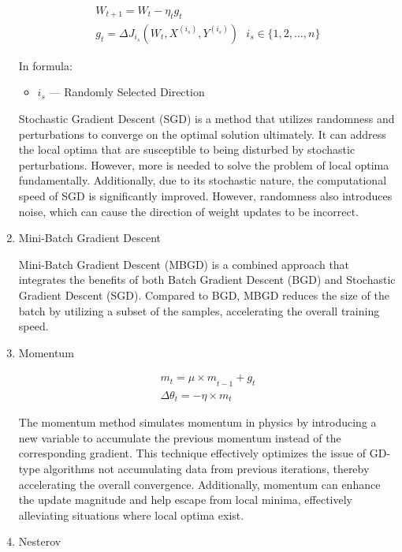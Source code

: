\documentclass[10pt,journal,compsoc]{IEEEtran}
\begin{document}
\begin{enumerate}
\begin{align}
    W_{t + 1} = W_t - \eta_t g_t \\
    g_t = \Delta J_{i_s} (W_t, X^{(i_s)}, Y^{(i_s)}) \ \ \ i_s\in \{ 1, 2, \ldots, n \}
\end{align}

In formula:

\begin{itemize}[label={}]
    \item $i_s$ --- Randomly Selected Direction
\end{itemize}

Stochastic Gradient Descent (SGD) is a method that utilizes randomness and perturbations to converge on the optimal solution ultimately. It can address the local optima that are susceptible to being disturbed by stochastic perturbations. However, more is needed to solve the problem of local optima fundamentally. Additionally, due to its stochastic nature, the computational speed of SGD is significantly improved. However, randomness also introduces noise, which can cause the direction of weight updates to be incorrect.

    \item Mini-Batch Gradient Descent

Mini-Batch Gradient Descent (MBGD) is a combined approach that integrates the benefits of both Batch Gradient Descent (BGD) and Stochastic Gradient Descent (SGD). Compared to BGD, MBGD reduces the size of the batch by utilizing a subset of the samples, accelerating the overall training speed.

    \item Momentum

\begin{align}
    {m_t = \mu \times m}_{t - 1} + g_t \\
    \Delta \theta_t = -\eta \times m_t
\end{align}

The momentum method simulates momentum in physics by introducing a new variable to accumulate the previous momentum instead of the corresponding gradient. This technique effectively optimizes the issue of GD-type algorithms not accumulating data from previous iterations, thereby accelerating the overall convergence. Additionally, momentum can enhance the update magnitude and help escape from local minima, effectively alleviating situations where local optima exist.

    \item Nesterov


\end{enumerate}
\end{document}
